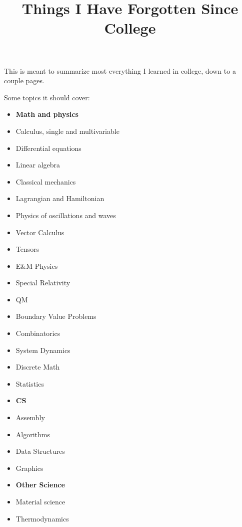\documentclass[10pt]{article}
\title{\bf Things I Have Forgotten Since College}
\author{}
\date{}
\begin{document}
\maketitle

This is meant to summarize most everything I learned in college, down
to a couple pages.

Some topics it should cover:
\begin{itemize}
\item \textbf{Math and physics}
\item Calculus, single and multivariable
\item Differential equations
\item Linear algebra
\item Classical mechanics
\item Lagrangian and Hamiltonian
\item Physics of oscillations and waves
\item Vector Calculus
\item Tensors
\item E\&M Physics
\item Special Relativity
\item QM
\item Boundary Value Problems
\item Combinatorics
\item System Dynamics
\item Discrete Math
\item Statistics
\item \textbf{CS}
\item Assembly
\item Algorithms
\item Data Structures
\item Graphics
\item \textbf{Other Science}
\item Material science
\item Thermodynamics
  
\end{itemize}

\newpage


\newpage


\newpage

\end{document}
